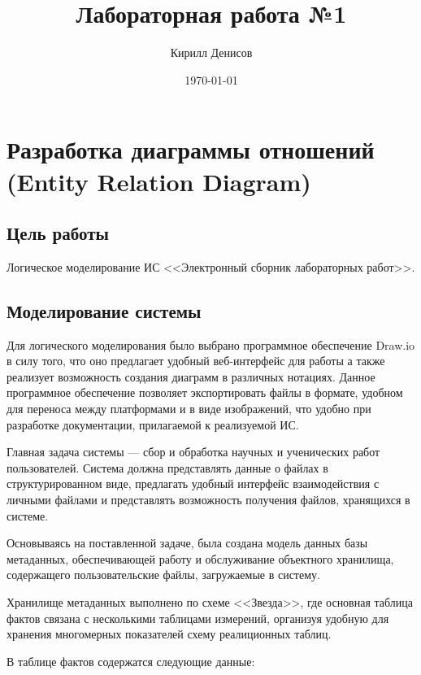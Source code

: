 \documentclass[a4paper,14pt]{extarticle}
\author{Кирилл Денисов}
\title{Лабораторная работа №1}
\date{\today}
\newcommand{\pathToCommonFolder}{/home/denilai/Documents/repos/latex/Common}
\begin{document}
	\thispagestyle{empty}
	
	\newpage
	\newpage
	
\normalsize

\section{Разработка диаграммы отношений (Entity Relation Diagram)}
\subsection{Цель работы}
Логическое моделирование ИС <<Электронный сборник лабораторных работ>>.
\subsection{Моделирование системы}
Для логического моделирования было выбрано программное обеспечение Draw.io в силу того, что оно предлагает удобный веб-интерфейс для работы а также реализует возможность создания диаграмм в различных нотациях. Данное программное обеспечение позволяет экспортировать файлы в формате, удобном для переноса между платформами и в виде изображений, что удобно при разработке документации, прилагаемой к реализуемой ИС.

Главная задача системы --- сбор и обработка научных и ученических работ пользователей. Система должна представлять данные о файлах в структурированном виде, предлагать удобный интерфейс взаимодействия с личными файлами и представлять возможность получения файлов, хранящихся в системе.

Основываясь на поставленной задаче, была создана модель данных базы метаданных, обеспечивающей работу и обслуживание объектного хранилища, содержащего пользовательские файлы, загружаемые в систему.

Хранилище метаданных выполнено по схеме <<Звезда>>, где основная таблица фактов связана с несколькими таблицами измерений, организуя удобную для хранения многомерных показателей схему реалиционных таблиц.

В таблице фактов содержатся следующие данные:
\end{document}
